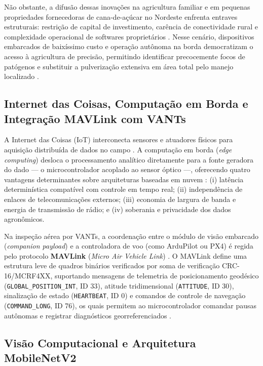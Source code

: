 \documentclass[12pt]{article}
\begin{document}
Não obstante, a difusão dessas inovações na agricultura familiar e em pequenas propriedades fornecedoras de cana-de-açúcar no Nordeste enfrenta entraves estruturais: restrição de capital de investimento, carência de conectividade rural e complexidade operacional de softwares proprietários \parencite{oliveira2024}. Nesse cenário, dispositivos embarcados de baixíssimo custo e operação autônoma na borda democratizam o acesso à agricultura de precisão, permitindo identificar precocemente focos de patógenos e substituir a pulverização extensiva em área total pelo manejo localizado \parencite{mariano2023}.

\subsection{Internet das Coisas, Computação em Borda e Integração MAVLink com VANTs}

A Internet das Coisas (IoT) interconecta sensores e atuadores físicos para aquisição distribuída de dados no campo \parencite{asi2014}. A computação em borda (\textit{edge computing}) desloca o processamento analítico diretamente para a fonte geradora do dado --- o microcontrolador acoplado ao sensor óptico ---, oferecendo quatro vantagens determinantes sobre arquiteturas baseadas em nuvem \parencite{satyanarayanan2009,shi2016,he2023}: (i) latência determinística compatível com controle em tempo real; (ii) independência de enlaces de telecomunicações externos; (iii) economia de largura de banda e energia de transmissão de rádio; e (iv) soberania e privacidade dos dados agronômicos.

Na inspeção aérea por VANTs, a coordenação entre o módulo de visão embarcado (\textit{companion payload}) e a controladora de voo (como ArduPilot ou PX4) é regida pelo protocolo \textbf{MAVLink} (\textit{Micro Air Vehicle Link}) \parencite{koubaa2019mavlink}. O MAVLink define uma estrutura leve de quadros binários verificados por soma de verificação CRC-16/MCRF4XX, suportando mensagens de telemetria de posicionamento geodésico (\texttt{GLOBAL\_POSITION\_INT}, ID 33), atitude tridimensional (\texttt{ATTITUDE}, ID 30), sinalização de estado (\texttt{HEARTBEAT}, ID 0) e comandos de controle de navegação (\texttt{COMMAND\_LONG}, ID 76), os quais permitem ao microcontrolador comandar pausas autônomas e registrar diagnósticos georreferenciados \parencite{radoglou2020compilation}.

\subsection{Visão Computacional e Arquitetura MobileNetV2}
\end{document}

